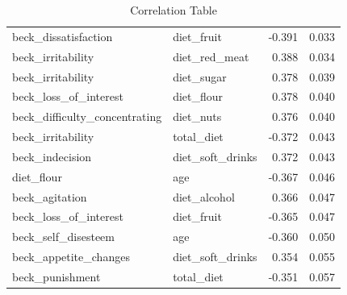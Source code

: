 \documentclass[jou]{apa7}
\begin{document}
\begin{table}[]
{\begin{tabular}{@{}llrr@{}}
			beck\_dissatisfaction           & diet\_fruit           & -0.391                                   & 0.033                                 \\
			beck\_irritability              & diet\_red\_meat       & 0.388                                    & 0.034                                 \\
			beck\_irritability              & diet\_sugar           & 0.378                                    & 0.039                                 \\
			beck\_loss\_of\_interest        & diet\_flour           & 0.378                                    & 0.040                                 \\
			beck\_difficulty\_concentrating & diet\_nuts            & 0.376                                    & 0.040                                 \\
			beck\_irritability              & total\_diet           & -0.372                                   & 0.043                                 \\
			beck\_indecision                & diet\_soft\_drinks    & 0.372                                    & 0.043                                 \\
			diet\_flour                     & age                   & -0.367                                   & 0.046                                 \\
			beck\_agitation                 & diet\_alcohol         & 0.366                                    & 0.047                                 \\
			beck\_loss\_of\_interest        & diet\_fruit           & -0.365                                   & 0.047                                 \\
			beck\_self\_disesteem           & age                   & -0.360                                   & 0.050                                 \\
			beck\_appetite\_changes         & diet\_soft\_drinks    & 0.354                                    & 0.055                                 \\
			beck\_punishment                & total\_diet           & -0.351                                   & 0.057                                 \\ \bottomrule
		\end{tabular}%
	}
	\caption{Correlation Table}
	\label{tab:tableOfCorr}
\end{table}
\end{document}
